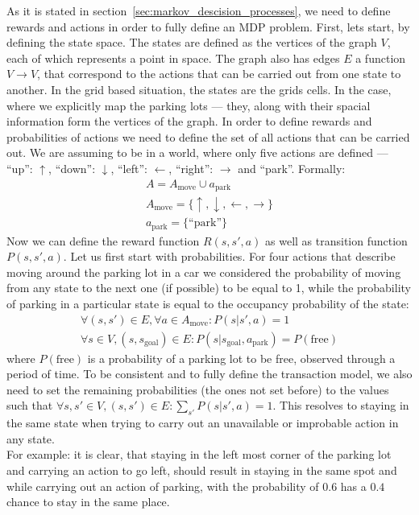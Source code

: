     As it is stated in section~\ref{sec:markov_descision_processes}, we need to define rewards and actions in order to fully define an MDP problem.
    First, lets start, by defining the state space. The states are defined as the vertices of the graph $V$, each of which represents a point in space. The graph also has edges $E$ a function $V \rightarrow V$, that correspond to the actions that can be carried out from one state to another. In the grid based situation, the states are the grids cells. In the case, where we explicitly map the parking lots --- they, along with their spacial information form the vertices of the graph.
    In order to define rewards and probabilities of actions we need to define the set of all actions that can be carried out. We are assuming to be in a world, where only five actions are defined --- ``up'': $\uparrow$,
    ``down'': $\downarrow$, ``left'': $\leftarrow$, ``right'': $\rightarrow$ and ``park''. Formally:
    \begin{eqnarray}
        A = A_{\mbox{move}} \cup a_{\mbox{park}} \\
        A_{\mbox{move}} = \{ \uparrow, \downarrow, \leftarrow, \rightarrow \} \\
        a_{\mbox{park}} = \{ \mbox{``park''} \}
    \end{eqnarray}
    Now we can define the reward function $R(s, s', a)$ as well as transition function $P(s, s', a)$.
    Let us first start with probabilities. For four actions that describe moving around the parking lot in a car we considered the probability of moving from any state to the next one (if possible) to be equal to 1, while the probability of parking in a particular state is equal to the occupancy probability of the state:
    \begin{eqnarray}
        \forall (s, s') \in E, \forall a \in A_{\mbox{move}} : P(s| s', a) = 1 \\
        \forall s \in V, (s,s_{\mbox{goal}}) \in E : P(s| s_{\mbox{goal}}, a_{\mbox{park}}) = P(\mbox{free})
    \end{eqnarray}
    where $P(\mbox{free})$ is a probability of a parking lot to be free, observed through a period of time.
    To be consistent and to fully define the transaction model, we also need to set the remaining probabilities (the ones not set before) to the values such that $\forall s, s' \in V, (s, s') \in E : \sum_{s'}P(s| s', a) = 1$.
    This resolves to staying in the same state when trying to carry out an unavailable or improbable action in any state. \\
    For example: it is clear, that staying in the left most corner of the parking lot and carrying an action to go left, should result in staying in the same spot and while carrying out an action of parking, with the probability of $0.6$ has a $0.4$ chance to stay in the same place.

